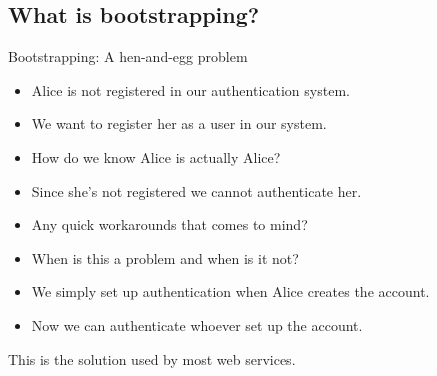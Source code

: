 \subsection{What is bootstrapping?}

\begin{frame}
  \begin{block}{Bootstrapping: A hen-and-egg problem}
    \begin{itemize}
      \item Alice is not registered in our authentication system.
      \item We want to register her as a user in our system.

        \pause{}

      \item How do we know Alice is actually Alice?
      \item Since she's not registered we cannot authenticate her.
    \end{itemize}
  \end{block}

  \pause{}

  \begin{exercise}
    \begin{itemize}
      \item Any quick workarounds that comes to mind?
      \item When is this a problem and when is it not?
    \end{itemize}
  \end{exercise}
\end{frame}

\begin{frame}
  \begin{solution}
    \begin{itemize}
      \item We simply set up authentication when Alice creates the account.
      \item Now we can authenticate whoever set up the account.
    \end{itemize}
  \end{solution}

  \pause{}

  \begin{example}
    This is the solution used by most web services.
  \end{example}
\end{frame}

